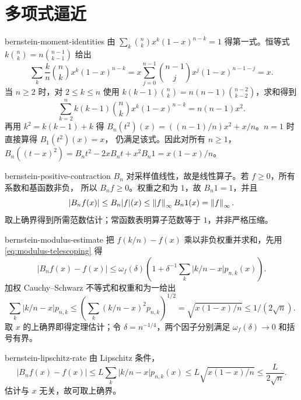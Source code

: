 \chapter{多项式逼近}
\label{chap:polynomial-approximation-solutions}

\begin{solution}{bernstein-moment-identities}
由 $\sum_k\binom nkx^k(1-x)^{n-k}=1$ 得第一式。恒等式
$k\binom nk=n\binom{n-1}{k-1}$ 给出
\[
 \sum_k\frac kn\binom nkx^k(1-x)^{n-k}
 =x\sum_{j=0}^{n-1}\binom{n-1}jx^j(1-x)^{n-1-j}=x.
\]
当 $n\ge2$ 时，对 $2\le k\le n$ 使用
$k(k-1)\binom nk=n(n-1)\binom{n-2}{k-2}$，求和得到
\[
 \sum_{k=2}^n k(k-1)\binom nkx^k(1-x)^{n-k}=n(n-1)x^2.
\]
再用 $k^2=k(k-1)+k$ 得
$B_n(t^2)(x)=((n-1)/n)x^2+x/n$。$n=1$ 时直接算得 $B_1(t^2)(x)=x$，
仍满足该式。因此对所有 $n\ge1$，
$B_n((t-x)^2)=B_nt^2-2xB_nt+x^2B_n1=x(1-x)/n$。
\end{solution}

\begin{solution}{bernstein-positive-contraction}
$B_n$ 对采样值线性，故是线性算子。若 $f\ge0$，所有系数和基函数非负，
所以 $B_nf\ge0$。权重之和为 $1$，故 $B_n1=1$，并且
\[
 |B_nf(x)|\le B_n|f|(x)\le\left\lVert f\right\rVert_\infty B_n1(x)=\left\lVert f\right\rVert_\infty.
\]
取上确界得到所需范数估计；常函数表明算子范数等于 $1$，并非严格压缩。
\end{solution}

\begin{solution}{bernstein-modulus-estimate}
把 $f(k/n)-f(x)$ 乘以非负权重并求和，先用
\eqref{eq:modulus-telescoping} 得
\[
 |B_nf(x)-f(x)|\le\omega_f(\delta)
 \left(1+\delta^{-1}\sum_k|k/n-x|p_{n,k}(x)\right).
\]
加权 Cauchy--Schwarz 不等式和权重和为一给出
\[
 \sum_k|k/n-x|p_{n,k}
 \le\left(\sum_k(k/n-x)^2p_{n,k}\right)^{1/2}
 =\sqrt{x(1-x)/n}\le1/(2\sqrt n).
\]
取 $x$ 的上确界即得定理估计；令 $\delta=n^{-1/4}$，两个因子分别满足
$\omega_f(\delta)\to0$ 和括号有界。
\end{solution}

\begin{solution}{bernstein-lipschitz-rate}
由 Lipschitz 条件，
\[
 |B_nf(x)-f(x)|\le L\sum_k|k/n-x|p_{n,k}(x)
 \le L\sqrt{x(1-x)/n}\le\frac{L}{2\sqrt n}.
\]
估计与 $x$ 无关，故可取上确界。
\end{solution}

